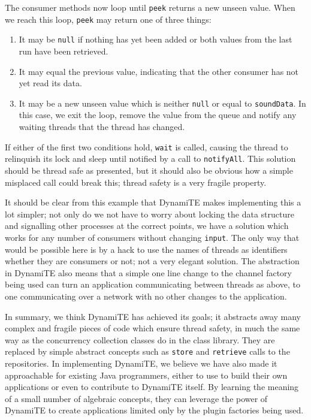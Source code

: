 The consumer methods now loop until \texttt{peek} returns a new unseen
value.  When we reach this loop, \texttt{peek} may return one of three
things:

\begin{enumerate}
\item It may be \texttt{null} if nothing has yet been added or both
  values from the last run have been retrieved.
\item It may equal the previous value, indicating that the other
  consumer has not yet read its data.
\item It may be a new unseen value which is neither \texttt{null} or
  equal to \texttt{soundData}.  In this case, we exit the loop, remove
  the value from the queue and notify any waiting threads that the
  thread has changed.
\end{enumerate}

If either of the first two conditions hold, \texttt{wait} is called,
causing the thread to relinquish its lock and sleep until notified by
a call to \texttt{notifyAll}.  This solution should be thread safe as
presented, but it should also be obvious how a simple misplaced call
could break this; thread safety is a very fragile property.

It should be clear from this example that DynamiTE makes implementing
this a lot simpler; not only do we not have to worry about locking the
data structure and signalling other processes at the correct points,
we have a solution which works for any number of consumers without
changing \texttt{input}.  The only way that would be possible here is
by a hack to use the names of threads as identifiers whether they are
consumers or not; not a very elegant solution.  The abstraction in
DynamiTE also means that a simple one line change to the channel
factory being used can turn an application communicating between
threads as above, to one communicating over a network with no other
changes to the application.

In summary, we think DynamiTE has achieved its goals; it abstracts
away many complex and fragile pieces of code which ensure thread
safety, in much the same way as the concurrency collection classes do
in the class library.  They are replaced by simple abstract concepts
such as \texttt{store} and \texttt{retrieve} calls to the repositories.
In implementing DynamiTE, we believe we have also made it approachable
for existing Java programmers, either to use to build their own
applications or even to contribute to DynamiTE itself.  By learning
the meaning of a small number of algebraic concepts, they can leverage
the power of DynamiTE to create applications limited only by the
plugin factories being used.


